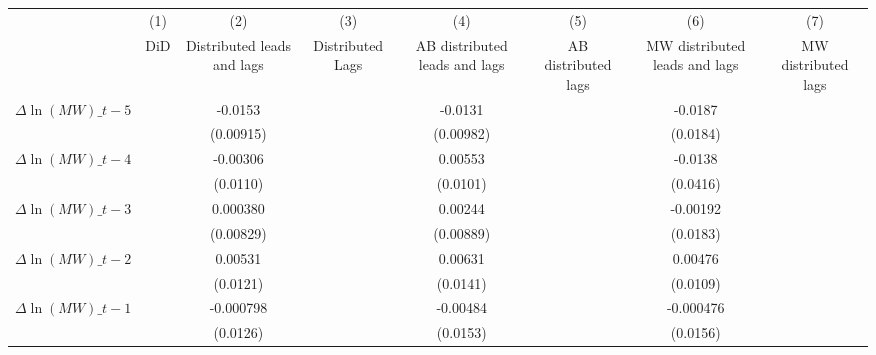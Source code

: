 {
\def\sym#1{\ifmmode^{#1}\else\(^{#1}\)\fi}
\begin{tabular}{l*{7}{c}}
\hline\hline
          &\multicolumn{1}{c}{(1)}&\multicolumn{1}{c}{(2)}&\multicolumn{1}{c}{(3)}&\multicolumn{1}{c}{(4)}&\multicolumn{1}{c}{(5)}&\multicolumn{1}{c}{(6)}&\multicolumn{1}{c}{(7)}\\
          &\multicolumn{1}{c}{DiD}&\multicolumn{1}{c}{Distributed leads and lags}&\multicolumn{1}{c}{Distributed Lags}&\multicolumn{1}{c}{AB distributed leads and lags}&\multicolumn{1}{c}{AB distributed lags}&\multicolumn{1}{c}{MW distributed leads and lags}&\multicolumn{1}{c}{MW distributed lags}\\
\hline
$\Delta \ln(MW)\_{t-5}$&                  &  -0.0153         &                  &  -0.0131         &                  &  -0.0187         &                  \\
          &                  &(0.00915)         &                  &(0.00982)         &                  & (0.0184)         &                  \\
[1em]
$\Delta \ln(MW)\_{t-4}$&                  & -0.00306         &                  &  0.00553         &                  &  -0.0138         &                  \\
          &                  & (0.0110)         &                  & (0.0101)         &                  & (0.0416)         &                  \\
[1em]
$\Delta \ln(MW)\_{t-3}$&                  & 0.000380         &                  &  0.00244         &                  & -0.00192         &                  \\
          &                  &(0.00829)         &                  &(0.00889)         &                  & (0.0183)         &                  \\
[1em]
$\Delta \ln(MW)\_{t-2}$&                  &  0.00531         &                  &  0.00631         &                  &  0.00476         &                  \\
          &                  & (0.0121)         &                  & (0.0141)         &                  & (0.0109)         &                  \\
[1em]
$\Delta \ln(MW)\_{t-1}$&                  &-0.000798         &                  & -0.00484         &                  &-0.000476         &                  \\
          &                  & (0.0126)         &                  & (0.0153)         &                  & (0.0156)         &                  \\

\end{tabular}}

